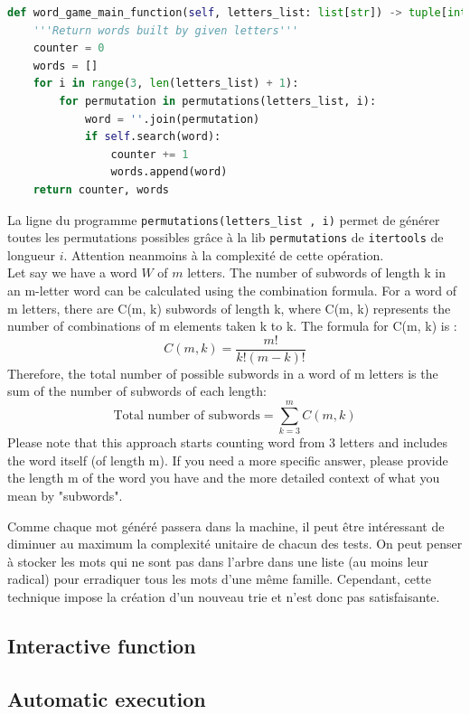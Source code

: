 \documentclass[10pt,a4paper,hidelinks]{article}
\begin{document}
\begin{lstlisting}[language=Python, caption=Python example]
def word_game_main_function(self, letters_list: list[str]) -> tuple[int, list[str]]:
    '''Return words built by given letters'''
    counter = 0
    words = []
    for i in range(3, len(letters_list) + 1):
        for permutation in permutations(letters_list, i):
            word = ''.join(permutation)
            if self.search(word):
                counter += 1
                words.append(word)
    return counter, words
\end{lstlisting}
La ligne du programme \verb|permutations(letters_list , i)| permet de générer toutes les permutations possibles grâce à la lib \verb|permutations| de \verb|itertools| de longueur $i$. Attention neanmoins à la complexité de cette opération.\\

Let say we have a word $W$ of $m$ letters.
The number of subwords of length k in an m-letter word can be calculated using the combination formula. For a word of m letters, there are C(m, k) subwords of length k, where C(m, k) represents the number of combinations of m elements taken k to k. The formula for C(m, k) is :
$$C(m, k) = \dfrac{m!}{k!(m - k)!}$$
Therefore, the total number of possible subwords in a word of m letters is the sum of the number of subwords of each length:
$$\text{Total number of subwords} = \sum_{k=3}^{m}C(m, k)$$
Please note that this approach starts counting word from 3 letters and includes the word itself (of length m).
If you need a more specific answer, please provide the length m of the word you have and the more detailed context of what you mean by "subwords".

Comme chaque mot généré passera dans la machine, il peut être intéressant de diminuer au maximum la complexité unitaire de chacun des tests. On peut penser à stocker les mots qui ne sont pas dans l'arbre dans une liste (au moins leur radical) pour erradiquer tous les mots d'une même famille. Cependant, cette technique impose la création d'un nouveau trie et n'est donc pas satisfaisante.

\subsection{Interactive function}

\subsection{Automatic execution}
\end{document}
